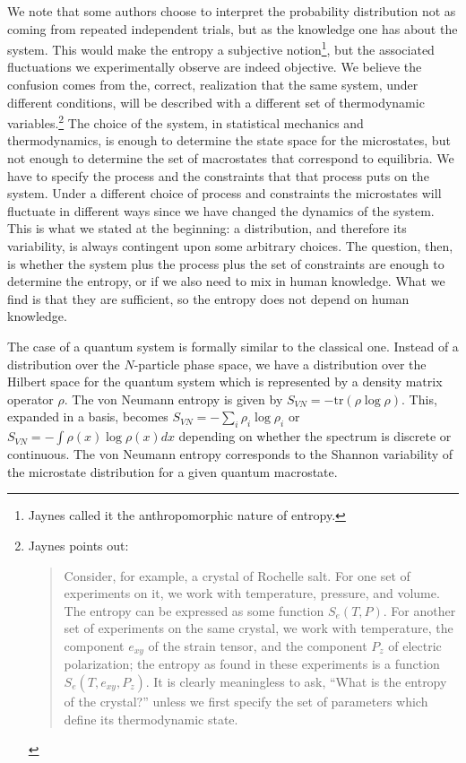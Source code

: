 \documentclass[prb, twocolumn]{revtex4-1}
\begin{document}
We note that some authors choose to interpret the probability distribution not as coming from repeated independent trials, but as the knowledge one has about the system. This would make the entropy a subjective notion\footnote{Jaynes called it the anthropomorphic nature of entropy.}, but the associated fluctuations we experimentally observe are indeed objective. We believe the confusion comes from the, correct, realization that the same system, under different conditions, will be described with a different set of thermodynamic variables.\footnote{Jaynes points out:
\begin{quote}
Consider, for example, a crystal of Rochelle salt. For one set of experiments on it, we work with temperature, pressure, and volume. The entropy can be expressed as some function $S_e(T,P)$. For another set of experiments on the same crystal, we work with temperature, the component $e_{xy}$ of the strain tensor, and the component $P_z$ of electric polarization; the entropy as found in these experiments is a function $S_e(T,e_{xy},P_z)$. It is clearly  meaningless to ask, ``What is the entropy of the crystal?''  unless we first specify the set of parameters which define its thermodynamic state.
\end{quote}}
The choice of the system, in statistical mechanics and thermodynamics, is enough to determine the state space for the microstates, but not enough to determine the set of macrostates that correspond to equilibria. We have to specify the process and the constraints that that process puts on the system. Under a different choice of process and constraints the microstates will fluctuate in different ways since we have changed the dynamics of the system. This is what we stated at the beginning: a distribution, and therefore its variability, is always contingent upon some arbitrary choices. The question, then, is whether the system plus the process plus the set of constraints are enough to determine the entropy, or if we also need to mix in human knowledge. What we find is that they are sufficient, so the entropy does not depend on human knowledge.

The case of a quantum system is formally similar to the classical one. Instead of a distribution over the $N$-particle phase space, we have a distribution over the Hilbert space for the quantum system which is represented by a density matrix operator $\rho$. The von Neumann entropy is given by $S_{V\!N} = - \textrm{tr}(\rho \log \rho)$. This, expanded in a basis, becomes $S_{V\!N} = - \sum_i \rho_i \log \rho_i$ or $S_{V\!N} = - \int \rho(x) \log \rho(x)dx$ depending on whether the spectrum is discrete or continuous.  The von Neumann entropy corresponds to the Shannon variability of the microstate distribution for a given quantum macrostate.
\end{document}
